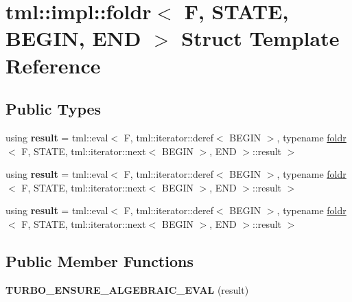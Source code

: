 \hypertarget{structtml_1_1impl_1_1foldr_3_01F_00_01STATE_00_01BEGIN_00_01END_01_4}{\section{tml\+:\+:impl\+:\+:foldr$<$ F, S\+T\+A\+T\+E, B\+E\+G\+I\+N, E\+N\+D $>$ Struct Template Reference}
\label{structtml_1_1impl_1_1foldr_3_01F_00_01STATE_00_01BEGIN_00_01END_01_4}
}
\subsection*{Public Types}
\begin{DoxyCompactItemize}
\item 
\hypertarget{structtml_1_1impl_1_1foldr_3_01F_00_01STATE_00_01BEGIN_00_01END_01_4_ae50706261674f30f859e8869aee8fd41}{using {\bfseries result} = tml\+::eval$<$ F, tml\+::iterator\+::deref$<$ B\+E\+G\+I\+N $>$, typename \hyperlink{structtml_1_1impl_1_1foldr}{foldr}$<$ F, S\+T\+A\+T\+E, tml\+::iterator\+::next$<$ B\+E\+G\+I\+N $>$, E\+N\+D $>$\+::result $>$}\label{structtml_1_1impl_1_1foldr_3_01F_00_01STATE_00_01BEGIN_00_01END_01_4_ae50706261674f30f859e8869aee8fd41}

\item 
\hypertarget{structtml_1_1impl_1_1foldr_3_01F_00_01STATE_00_01BEGIN_00_01END_01_4_ae50706261674f30f859e8869aee8fd41}{using {\bfseries result} = tml\+::eval$<$ F, tml\+::iterator\+::deref$<$ B\+E\+G\+I\+N $>$, typename \hyperlink{structtml_1_1impl_1_1foldr}{foldr}$<$ F, S\+T\+A\+T\+E, tml\+::iterator\+::next$<$ B\+E\+G\+I\+N $>$, E\+N\+D $>$\+::result $>$}\label{structtml_1_1impl_1_1foldr_3_01F_00_01STATE_00_01BEGIN_00_01END_01_4_ae50706261674f30f859e8869aee8fd41}

\item 
\hypertarget{structtml_1_1impl_1_1foldr_3_01F_00_01STATE_00_01BEGIN_00_01END_01_4_ae50706261674f30f859e8869aee8fd41}{using {\bfseries result} = tml\+::eval$<$ F, tml\+::iterator\+::deref$<$ B\+E\+G\+I\+N $>$, typename \hyperlink{structtml_1_1impl_1_1foldr}{foldr}$<$ F, S\+T\+A\+T\+E, tml\+::iterator\+::next$<$ B\+E\+G\+I\+N $>$, E\+N\+D $>$\+::result $>$}\label{structtml_1_1impl_1_1foldr_3_01F_00_01STATE_00_01BEGIN_00_01END_01_4_ae50706261674f30f859e8869aee8fd41}

\end{DoxyCompactItemize}
\subsection*{Public Member Functions}
\begin{DoxyCompactItemize}
\item 
\hypertarget{structtml_1_1impl_1_1foldr_3_01F_00_01STATE_00_01BEGIN_00_01END_01_4_afd203ee941434bbf2ffde54559299cc5}{{\bfseries T\+U\+R\+B\+O\+\_\+\+E\+N\+S\+U\+R\+E\+\_\+\+A\+L\+G\+E\+B\+R\+A\+I\+C\+\_\+\+E\+V\+A\+L} (result)}\label{structtml_1_1impl_1_1foldr_3_01F_00_01STATE_00_01BEGIN_00_01END_01_4_afd203ee941434bbf2ffde54559299cc5}

\end{DoxyCompactItemize}


